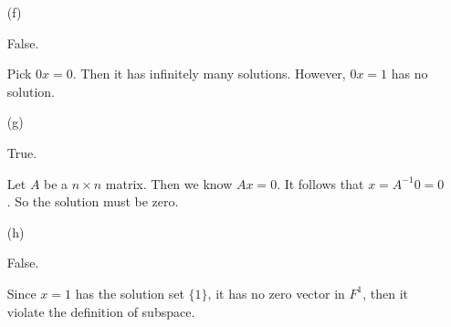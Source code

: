 \begin{Exercise}
\begin{enumerate}[(a)]
\item[(f)]
\begin{answer}
False.
\end{answer}
\begin{solution}
Pick $0x = 0$. Then it has infinitely many solutions. However, $0x = 1$ has no solution.
\end{solution}

\item[(g)]
\begin{answer}
True.
\end{answer}
\begin{solution}
Let $A$ be a $n\times n$ matrix. Then we know $Ax = 0$. It follows that $x = A^{-1} 0 = 0$. So the solution must be zero.
\end{solution}

\item[(h)]
\begin{answer}
False.
\end{answer}
\begin{solution}
Since $x = 1$ has the solution set $\{1\}$, it has no zero vector in $F^1$, then it violate the definition of subspace.
\end{solution}

\end{enumerate}
\end{Exercise}